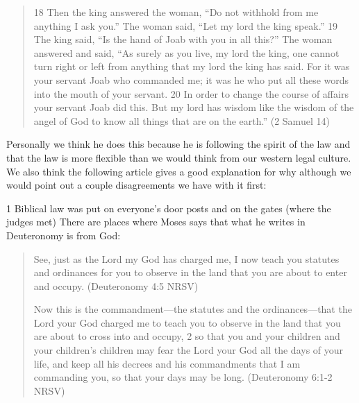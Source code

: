 \documentclass[11pt]{article}
\begin{document}
\begin{quote}
18 Then the king answered the woman, “Do not withhold from me anything I ask you.” The woman said, “Let my lord the king speak.” 19 The king said, “Is the hand of Joab with you in all this?” The woman answered and said, “As surely as you live, my lord the king, one cannot turn right or left from anything that my lord the king has said. For it was your servant Joab who commanded me; it was he who put all these words into the mouth of your servant. 20 In order to change the course of affairs your servant Joab did this. But my lord has wisdom like the wisdom of the angel of God to know all things that are on the earth.”
(2 Samuel 14)
\end{quote}

Personally we think he does this because he is following the spirit of the law and that the law is more flexible than we would think from our western legal culture. We also think the following article gives a good explanation for why although we would point out a couple disagreements we have with it first:

1 Biblical law was put on everyone's door posts and on the gates (where the judges met)
There are places where Moses says that what he writes in Deuteronomy is from God:
\begin{quote}
See, just as the Lord my God has charged me, I now teach you statutes and ordinances for you to observe in the land that you are about to enter and occupy.
(Deuteronomy 4:5 NRSV)

Now this is the commandment—the statutes and the ordinances—that the Lord your God charged me to teach you to observe in the land that you are about to cross into and occupy, 2 so that you and your children and your children’s children may fear the Lord your God all the days of your life, and keep all his decrees and his commandments that I am commanding you, so that your days may be long.
(Deuteronomy 6:1-2 NRSV)
\end{quote}
\end{document}
